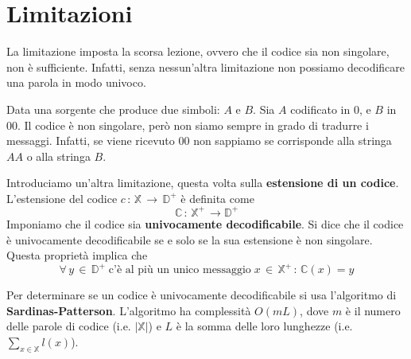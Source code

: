 \documentclass[12pt]{report}
\begin{document}
    \section{Limitazioni}

    La limitazione imposta la scorsa lezione, ovvero che il codice sia non singolare, non è sufficiente. Infatti, senza nessun'altra limitazione non possiamo decodificare una parola in modo univoco.  \\

    \begin{exmp}
        Data una sorgente che produce due simboli: $A$ e $B$.
        Sia $A$ codificato in $0$, e $B$ in $00$. Il codice è non singolare, però non siamo sempre in grado di tradurre i messaggi. Infatti, se viene ricevuto $00$ non sappiamo se corrisponde alla stringa $AA$ o alla stringa $B$.
    \end{exmp}


    \noindent Introduciamo un'altra limitazione, questa volta sulla \textbf{estensione di un codice}.  L'estensione del codice $c\,:\, \mathbb{X}\,\rightarrow \, \mathbb{D}^+$ è definita come $$\mathbb{C}\, : \, \mathbb{X}^+ \, \rightarrow \mathbb{D}^+$$
    Imponiamo che il codice sia \textbf{univocamente decodificabile}. Si dice che il codice è univocamente decodificabile se e solo se la sua estensione è non singolare. Questa proprietà implica che
    $$\forall \, y \, \in \, \mathbb{D}^+ \; \text{c'è al più un  unico messaggio} \;
    x\,\in \,\mathbb{X}^+ \,: \, \mathbb{C}(x) = y$$

    \noindent Per determinare se un codice è univocamente decodificabile si usa l'algoritmo di \textbf{Sardinas-Patterson}. L'algoritmo ha complessità $O(mL)$, dove $m$ è il numero delle parole di codice (i.e. $|\mathbb{X}|$) e $L$ è la somma delle loro lunghezze (i.e. $\sum_{x\in\mathbb{X}} l(x)$). \\

    \begin{center}
        \def\firstcircle{(0,0) circle (1.5cm)}
        \def\secondcircle{(5:1cm) circle (3cm)}
    \end{center}
    \vspace{10px}
\end{document}
